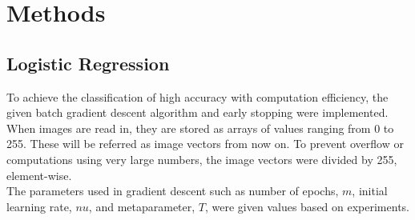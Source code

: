 \documentclass[11pt,twoside]{article}
\begin{document}
\section{Methods}

\subsection{Logistic Regression}

To achieve the classification of high accuracy with computation efficiency, the given batch gradient descent algorithm and early stopping were implemented.\\ 

When images are read in, they are stored as arrays of values ranging from 0 to 255. These will be referred as image vectors from now on. To prevent overflow or computations using very large numbers, the image vectors were divided by 255, element-wise.\\

The parameters used in gradient descent such as number of epochs, $m$, initial learning rate, $nu$, and metaparameter, $T$, were given values based on experiments.\\
\end{document}
